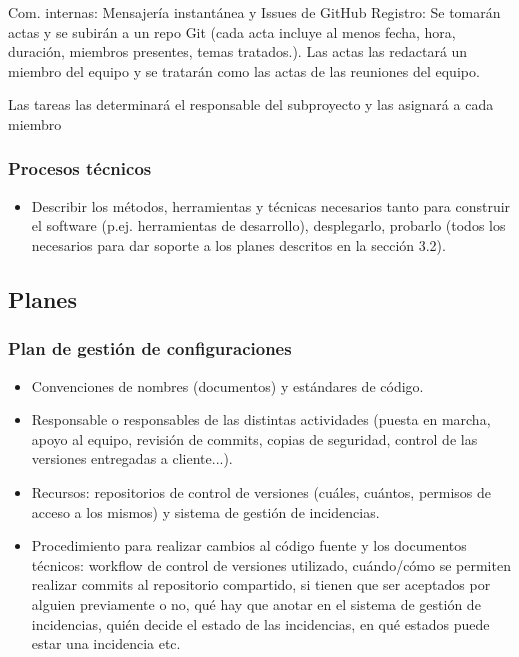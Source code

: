 \documentclass[12pt]{article}%
\begin{document}
Com. internas: Mensajer\'ia instant\'anea y Issues de GitHub
Registro: Se tomar\'an actas y se subir\'an a un repo Git (cada acta incluye al menos fecha, hora, duraci\'on, miembros presentes, temas tratados.).
Las actas las redactar\'a un miembro del equipo y se tratar\'an como las actas de las reuniones del equipo.

Las tareas las determinar\'a el responsable del subproyecto y las asignar\'a a cada miembro

\subsubsection{Procesos t\'ecnicos}
\begin{itemize}
	\item Describir los m\'etodos, herramientas y t\'ecnicas necesarios tanto para construir el software (p.ej. herramientas de desarrollo), desplegarlo, probarlo (todos los necesarios para dar soporte a los planes descritos en la secci\'on 3.2).\\
\end{itemize}

\subsection{Planes}
\subsubsection{Plan de gesti\'on de configuraciones}
\begin{itemize}
	\item Convenciones de nombres (documentos) y est\'andares de c\'odigo.
	\item Responsable o responsables de las distintas actividades (puesta en marcha, apoyo al equipo, revisi\'on de commits, copias de seguridad, control de las versiones entregadas a cliente...).
	\item Recursos: repositorios de control de versiones (cu\'ales, cu\'antos, permisos de acceso a los mismos) y sistema de gesti\'on de incidencias.
	\item Procedimiento para realizar cambios al c\'odigo fuente y los documentos t\'ecnicos: workflow de control de versiones utilizado, cu\'ando/c\'omo se permiten realizar commits al repositorio compartido, si tienen que ser aceptados por alguien previamente o no, qu\'e hay que anotar en el sistema de gesti\'on de incidencias, qui\'en decide el estado de las incidencias, en qu\'e estados puede estar una incidencia etc.
\end{itemize}
\end{document}
